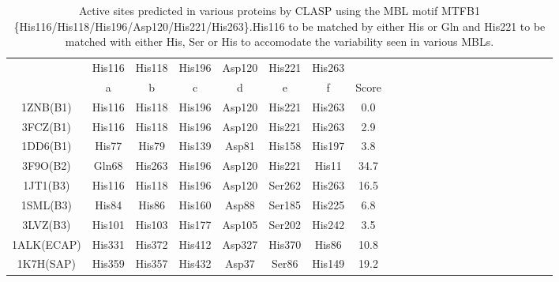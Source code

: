 \begin{center} 
\begin{table*} 
\caption { Active sites predicted in various proteins by CLASP using the MBL motif MTFB1 \{His116/His118/His196/Asp120/His221/His263\}.His116 to be matched by either His or Gln and His221 to be matched with either His, Ser or His to accomodate the variability seen in various MBLs. }  
\begin{tabular}{ c  c c c c c c c c c c c c c c  c c  c c c c c c } 
\hline 
 & His116&  His118& His196& Asp120& His221& His263  \\
 & a&  b& c& d& e& f & Score  \\
\hline 
 1ZNB(B1)&  His116&  His118& His196& Asp120& His221& His263  &     0.0\\
 3FCZ(B1) & His116 & His118 & His196 & Asp120 & His221 & His263 &     2.9\\
 1DD6(B1) & His77 & His79 & His139 & Asp81 & His158 & His197 &     3.8\\
 3F9O(B2) & Gln68 &  His263&  His196&  Asp120&  His221&  His11 &    34.7\\
 1JT1(B3) & His116 & His118 & His196 & Asp120 & Ser262 & His263 &    16.5\\
 1SML(B3) & His84 & His86 & His160 & Asp88 & Ser185 & His225 &     6.8\\
 3LVZ(B3) & His101 & His103 & His177 & Asp105 & Ser202 & His242 &     3.5\\
 1ALK(ECAP) & His331 & His372 & His412 & Asp327 & His370 & His86 &    10.8\\
 1K7H(SAP) & His359 & His357 & His432 & Asp37 & Ser86 & His149 &    19.2\\

\hline 
\end{tabular}  \label{tableres} 
\end{table*} 
\end{center} 
